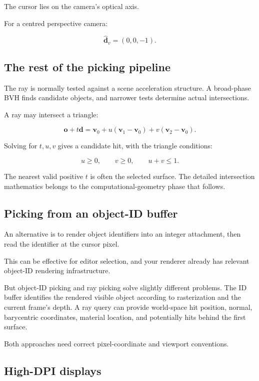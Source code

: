 The cursor lies on the camera's optical axis.

For a centred perspective camera:

\[ \boxed{ \hat{\mathbf d}_v=(0,0,-1). } \]

\subsection{The rest of the picking pipeline}\label{02-foundations-ii-ch035-the-rest-of-the-picking-pipeline}

The ray is normally tested against a scene acceleration structure. A broad-phase BVH finds candidate objects, and narrower tests determine actual intersections.

A ray may intersect a triangle:

\[ \mathbf o+t\mathbf d = \mathbf v_0+ u(\mathbf v_1-\mathbf v_0)+ v(\mathbf v_2-\mathbf v_0). \]

Solving for \(t,u,v\) gives a candidate hit, with the triangle conditions:

\[ u\ge0,\qquad v\ge0,\qquad u+v\le1. \]

The nearest valid positive \(t\) is often the selected surface. The detailed intersection mathematics belongs to the computational-geometry phase that follows.

\subsection{Picking from an object-ID buffer}\label{02-foundations-ii-ch035-picking-from-an-object-id-buffer}

An alternative is to render object identifiers into an integer attachment, then read the identifier at the cursor pixel.

This can be effective for editor selection, and your renderer already has relevant object-ID rendering infrastructure.

But object-ID picking and ray picking solve slightly different problems. The ID buffer identifies the rendered visible object according to rasterization and the current frame's depth. A ray query can provide world-space hit position, normal, barycentric coordinates, material location, and potentially hits behind the first surface.

Both approaches need correct pixel-coordinate and viewport conventions.

\subsection{High-DPI displays}\label{02-foundations-ii-ch035-high-dpi-displays}

